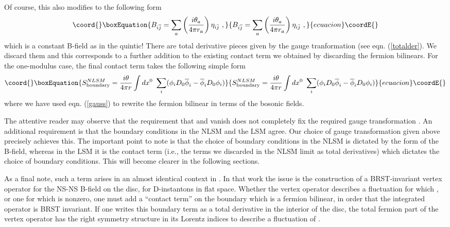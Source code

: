 \documentclass[a4paper,12pt]{article}
\begin{document}
Of course, this also modifies \coordHE{} to the following form
\begin{equation}\coord{}\boxEquation{
B_{i\overline{j}} =
\sum_a \left(\frac{i\theta_a}{4\pi r_a} \right)\eta_{i\bar{j}}\ ,
}{
B_{i\overline{j}} =
\sum_a \left(\frac{i\theta_a}{4\pi r_a} \right)\eta_{i\bar{j}}\ ,
}{ecuacion}\coordE{}\end{equation}
which is a constant B-field as in the quintic! There are total
derivative pieces given by the gauge tranformation (see eqn.
(\ref{totalder}). We discard
them and this corresponds to a further addition to the existing contact term 
we obtained by discarding the fermion bilinears. 
For the one-modulus case, the final contact term 
takes the following simple form 
\begin{equation}\coord{}\boxEquation{
S^{NLSM}_{\rm boundary}= {{i\theta}\over{4\pi r}} \int dx^0\ 
\sum_i (\phi_i D_0\overline{\phi}_i - \overline{\phi}_iD_0 \phi_i)
\label{nlsmcontact}
}{
S^{NLSM}_{\rm boundary}= {{i\theta}\over{4\pi r}} \int dx^0\ 
\sum_i (\phi_i D_0\overline{\phi}_i - \overline{\phi}_iD_0 \phi_i)
}{ecuacion}\coordE{}\end{equation}
where we have used eqn. (\ref{gauss}) to rewrite the fermion bilinear in
terms of the bosonic fields.

The attentive reader may observe that the requirement that
\coordHE{} and \coordHE{} vanish does not completely
fix the required gauge transformation \myHighlight{$\Lambda_\mu$}\coordHE{}. An additional
requirement is that the boundary conditions in the NLSM and the LSM
agree. Our choice of gauge
transformation given above precisely achieves this.
The important point to note is that the choice of boundary conditions in
the NLSM is dictated by the form of the B-field, whereas in the LSM it is the
contact term (i.e., the terms we discarded in the NLSM limit as total
derivatives) which dictates the choice of boundary conditions. 
This
will become clearer in the following sections. 

As a final note, such a term arises
in an almost identical context in \cite{gut}.
In that work the issue is the construction of
a BRST-invariant vertex operator for the NS-NS B-field
on the disc, for D-instantons in flat space.
Whether the vertex operator describes a fluctuation
\myHighlight{$\delta B$}\coordHE{} for which \coordHE{}, or one for
which \myHighlight{$\delta H$}\coordHE{} is nonzero, one must add
a ``contact term'' on the boundary which is a fermion
bilinear, in order that the integrated
operator is BRST invariant.  If one writes this
boundary term as a total derivative in the
interior of the disc,
the total fermion part of the vertex operator
has the right symmetry structure in its Lorentz indices to
describe a fluctuation of \myHighlight{$H$}\coordHE{}.
\end{document}

